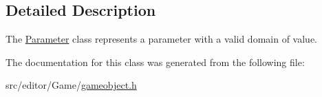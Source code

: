 \subsection{\-Detailed \-Description}
\-The \hyperlink{class_parameter}{\-Parameter} class represents a parameter with a valid domain of value. 

\-The documentation for this class was generated from the following file\-:\begin{DoxyCompactItemize}
\item 
src/editor/\-Game/\hyperlink{gameobject_8h}{gameobject.\-h}\end{DoxyCompactItemize}
